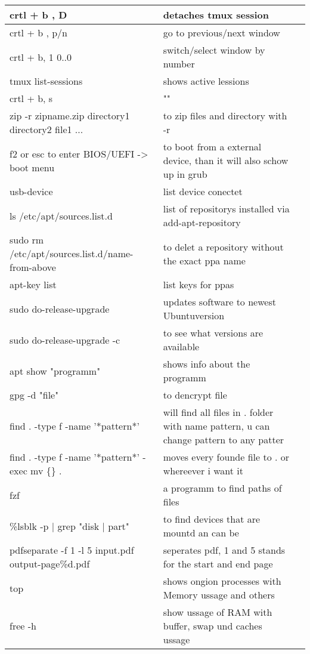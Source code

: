\documentclass[12pt]{article}
\begin{document}
\begin{tabular}{| p{6.5cm} | p{6.5cm} | p{6.5cm} |}
    \hline 
    crtl + b , D & detaches tmux session &\\
    \hline
    crtl + b , p/n & go to previous/next window & \\
    \hline
    crtl + b, 1 0..0 & switch/select window by number & \\
    \hline
    tmux list-sessions & shows active lessions & \\
    \hline
    crtl + b, s & "" & \\
    \hline
    zip -r zipname.zip directory1 directory2 file1 ... & to zip files and directory with -r & \\
    \hline
    f2 or esc to enter BIOS/UEFI -> boot menu & to boot from a external device, than it will also schow up in grub &\\
    \hline 
    usb-device & list device conectet &\\
    \hline
    ls /etc/apt/sources.list.d & list of repositorys installed via add-apt-repository & \\
    \hline
    sudo rm /etc/apt/sources.list.d/name- from-above & to delet a repository without the exact ppa name &\\
    \hline
    apt-key list & list keys for ppas &\\
    \hline
    sudo do-release-upgrade & updates software to newest Ubuntuversion &\\
    \hline 
    sudo do-release-upgrade -c & to see what versions are available &\\
    \hline
    apt show "programm" & shows info about the programm &\\
    \hline
    gpg -d "file" & to dencrypt file &\\
    \hline 
    find . -type f -name '*pattern*' & will find all files in . folder with name pattern, u can change pattern to any patter &\\
    \hline
    find . -type f -name '*pattern*' -exec mv \{\} . \; & moves every founde file to . or whereever i want it &\\
    \hline 
    fzf & a programm to find paths of files & \\
    \hline 
    \%lsblk -p | grep "disk | part" & to find devices that are mountd an can be & \\
    \hline 
    pdfseparate -f 1 -l 5 input.pdf output-page\%d.pdf & seperates pdf, 1 and 5 stands for the start and end page & \\
    \hline
    top & shows ongion processes with Memory ussage and others & \\
    \hline
    free -h & show ussage of RAM with buffer, swap und caches ussage & \\
    \hline 
\end{tabular}
\end{document}
